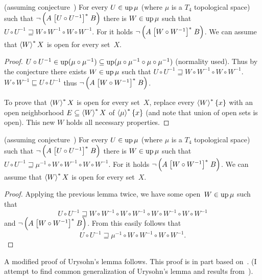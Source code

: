 \begin{lem}
  (assuming conjecture~) For every $U \in \operatorname{up} \mu$ (where $\mu$ is a $T_4$ topological space) such that
  $\neg \left( A \mathrel{\left[U \circ U^{- 1}\right]^{\ast}} B \right)$ there is $W \in
  \operatorname{up} \mu$ such that $U \circ U^{- 1} \sqsupseteq W \circ W^{- 1}
  \circ W \circ W^{- 1}$. For it holds $\neg \left( A \mathrel{\left[W \circ W^{-
  1}\right]^{\ast}} B \right)$.
  We can assume that $\left\langle W\right\rangle ^{\ast}X$ is open for every set~$X$.
\end{lem}

\begin{proof}
  $U \circ U^{- 1} \in \operatorname{up} (\mu \circ \mu^{- 1}) \subseteq
  \operatorname{up} (\mu \circ \mu^{- 1} \circ \mu \circ
  \mu^{- 1})$ (normality used). Thus by the conjecture there exists $W
  \in \operatorname{up} \mu$ such that $U \circ U^{- 1} \sqsupseteq W \circ W^{-
  1} \circ W \circ W^{- 1}$. $W \circ W^{- 1} \sqsubseteq U \circ U^{- 1}$
  thus $\neg \left( A \mathrel{\left[W \circ W^{- 1}\right]^{\ast}} B \right)$.
  
  To prove that $\left\langle W\right\rangle ^{\ast}X$ is open for every set~$X$, replace every $\left\langle W\right\rangle ^{\ast}\{x\}$
  with an open neighborhood $E\subseteq\left\langle W\right\rangle ^{\ast}X$ of $\left\langle \mu\right\rangle ^{\ast}\{x\}$
  (and note that union of open sets is open).
  This new $W$ holds all necessary properties.
\end{proof}

\begin{lem}
  (assuming conjecture~) For every $U \in \operatorname{up} \mu$ (where $\mu$ is a $T_4$ topological space) such that
  $\neg \left( A \mathrel{\left[U \circ U^{- 1}\right]^{\ast}} B \right)$ there is $W \in \operatorname{up}\mu$
  such that $U \circ U^{- 1} \sqsupseteq \mu^{-1} \circ W \circ W^{-1}\circ W \circ W^{- 1}$.
  For it holds $\neg \left( A \mathrel{\left[W \circ W^{-
  1}\right]^{\ast}} B \right)$.
  We can assume that $\left\langle W\right\rangle ^{\ast}X$ is open for every set~$X$.
\end{lem}

\begin{proof}
Applying the previous lemma twice, we have some open~$W\in\operatorname{up}\mu$ such that
\[ U\circ U^{-1} \sqsupseteq W \circ W^{-1}\circ W \circ W^{- 1} \circ W \circ W^{-1}\circ W \circ W^{- 1} \]
and $\neg \left( A \mathrel{\left[W \circ W^{-1}\right]^{\ast}} B \right)$.
From this easily follows that \[ U \circ U^{- 1} \sqsupseteq \mu^{-1} \circ W \circ W^{-1}\circ W \circ W^{- 1}. \]
\end{proof}

A modified proof of Urysohn's lemma follows. This proof is in part based on~\cite{2014arXiv1410.1504B}.
(I attempt to find common generalization of Urysohn's lemma and results from~\cite{2014arXiv1410.1504B}).

